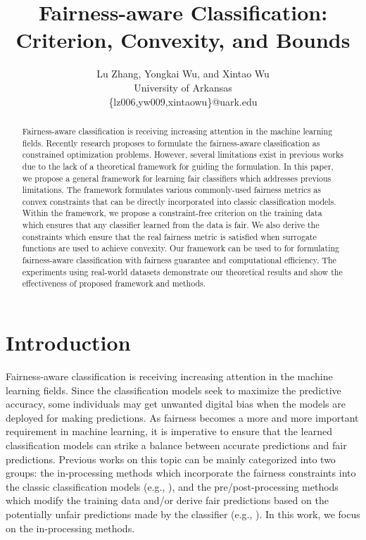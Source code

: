 \documentclass[letterpaper]{article} %
\begin{document}
%
\title{Fairness-aware Classification: Criterion, Convexity, and Bounds}
\author{Lu Zhang, Yongkai Wu, and Xintao Wu\\
University of Arkansas\\
\{lz006,yw009,xintaowu\}@uark.edu}

\maketitle
\begin{abstract}
Fairness-aware classification is receiving increasing attention in the machine learning fields. Recently research proposes to formulate the fairness-aware classification as constrained optimization problems. However, several limitations exist in previous works due to the lack of a theoretical framework for guiding the formulation. In this paper, we propose a general framework for learning fair classifiers which addresses previous limitations. The framework formulates various commonly-used fairness metrics as convex constraints that can be directly incorporated into classic classification models. Within the framework, we propose a constraint-free criterion on the training data which ensures that any classifier learned from the data is fair. We also derive the constraints which ensure that the real fairness metric is satisfied when surrogate functions are used to achieve convexity. Our framework can be used to for formulating fairness-aware classification with fairness guarantee and computational efficiency. The experiments using real-world datasets demonstrate our theoretical results and show the effectiveness of proposed framework and methods.
\end{abstract}

\section{Introduction}
Fairness-aware classification is receiving increasing attention in the machine learning fields. Since the classification models seek to maximize the predictive accuracy, some individuals may get unwanted digital bias when the models are deployed for making predictions. As fairness becomes a more and more important requirement in machine learning, it is imperative to ensure that the learned classification models can strike a balance between accurate predictions and fair predictions. Previous works on this topic can be mainly categorized into two groups: the in-processing methods which incorporate the fairness constraints into the classic classification models (e.g., \cite{Kamishima2011a,Goh,Krishna2018,Zafar2017b,Zafar2017a}), and the pre/post-processing methods which modify the training data and/or derive fair predictions based on the potentially unfair predictions made by the classifier (e.g., \cite{Feldman2015,Hardt2016,Zhang2017a,Zhang2017c,zhang2018achieving}). In this work, we focus on the in-processing methods.
\end{document}
